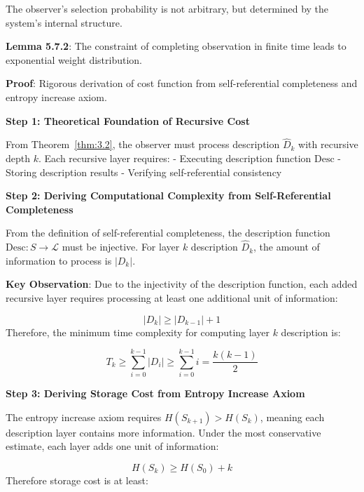   The observer's selection probability is not arbitrary, but determined by the system's internal structure.
   
   \textbf{Lemma 5.7.2}: The constraint of completing observation in finite time leads to exponential weight distribution.
\label{thm:3.5}
   
   \textbf{Proof}: Rigorous derivation of cost function from self-referential completeness and entropy increase axiom.
   
   \textbf{Step 1: Theoretical Foundation of Recursive Cost}
   
   From Theorem~\ref{thm:3.2}, the observer must process description $\hat{D}_k$ with recursive depth $k$. Each recursive layer requires:
   - Executing description function $\text{Desc}$
   - Storing description results
   - Verifying self-referential consistency
   
   \textbf{Step 2: Deriving Computational Complexity from Self-Referential Completeness}
   
   From the definition of self-referential completeness, the description function $\text{Desc}: S \to \mathcal{L}$ must be injective.
   For layer $k$ description $\hat{D}_k$, the amount of information to process is $|D_k|$.
   
   \textbf{Key Observation}: Due to the injectivity of the description function, each added recursive layer requires processing at least one additional unit of information:
   
\begin{equation}
|D_k| \geq |D_{k-1}| + 1
\end{equation}
   Therefore, the minimum time complexity for computing layer $k$ description is:
   
\begin{equation}
T_k \geq \sum_{i=0}^{k-1} |D_i| \geq \sum_{i=0}^{k-1} i = \frac{k(k-1)}{2}
\end{equation}

   \textbf{Step 3: Deriving Storage Cost from Entropy Increase Axiom}
   
   The entropy increase axiom requires $H(S_{k+1}) > H(S_k)$, meaning each description layer contains more information.
   Under the most conservative estimate, each layer adds one unit of information:
   
\begin{equation}
H(S_k) \geq H(S_0) + k
\end{equation}
   Therefore storage cost is at least:
   
